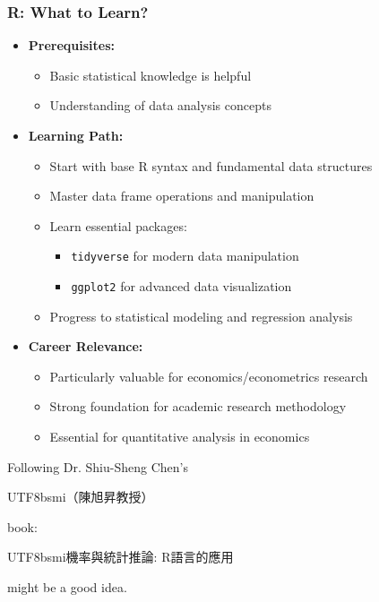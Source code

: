 \documentclass[10pt]{beamer}
\begin{document}
\begin{frame}
    \frametitle{R: What to Learn?}
    \begin{itemize}
        \item \textbf{Prerequisites:}
            \begin{itemize}
                \item Basic statistical knowledge is helpful
                \item Understanding of data analysis concepts
            \end{itemize}
        \item \textbf{Learning Path:}
            \begin{itemize}
                \item Start with base R syntax and fundamental data structures
                \item Master data frame operations and manipulation
                \item Learn essential packages:
                    \begin{itemize}
                        \item \texttt{tidyverse} for modern data manipulation
                        \item \texttt{ggplot2} for advanced data visualization
                    \end{itemize}
                \item Progress to statistical modeling and regression analysis
            \end{itemize}
        \item \textbf{Career Relevance:}
            \begin{itemize}
                \item Particularly valuable for economics/econometrics research
                \item Strong foundation for academic research methodology
                \item Essential for quantitative analysis in economics
            \end{itemize}
    \end{itemize}

    Following Dr. Shiu-Sheng Chen's {\small \begin{CJK*}{UTF8}{bsmi}（陳旭昇教授）\end{CJK*}} book: {\small \begin{CJK*}{UTF8}{bsmi}機率與統計推論: R語言的應用\end{CJK*}} might be a good idea.
\end{frame}
\end{document}

